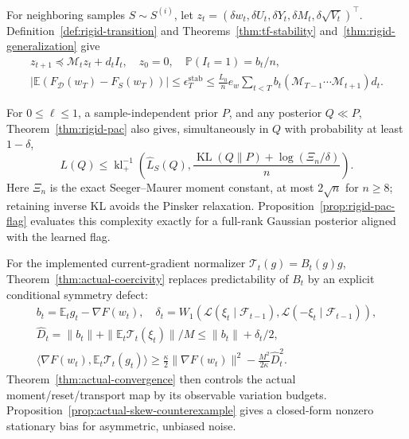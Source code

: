 For neighboring samples $S\sim S^{(i)}$, let
$z_t=(\delta w_t,\delta U_t,\delta Y_t,\delta M_t,\delta\sqrt{V_t})^\top$.
Definition~\ref{def:rigid-transition} and Theorems~\ref{thm:tf-stability}
and~\ref{thm:rigid-generalization} give
\begin{gather}
 z_{t+1}\preceq\mathcal M_tz_t+d_t I_t,\quad z_0=0,\quad
 \mathbb P(I_t=1)=b_t/n,\\
 \left|\mathbb E(F_\mathcal D(w_T)-F_S(w_T))\right|
 \le\epsilon_T^{\mathrm{stab}}
 \le\frac{L_0}{n}e_w\sum_{t<T}b_t
                  (\mathcal M_{T-1}\cdots\mathcal M_{t+1})d_t.
\end{gather}

For $0\le\ell\le1$, a sample-independent prior $P$, and any posterior $Q\ll P$,
Theorem~\ref{thm:rigid-pac} also gives, simultaneously in $Q$ with probability
at least $1-\delta$,
\begin{equation}
 L(Q)\le\operatorname{kl}_+^{-1}\!\left(\widehat L_S(Q),
 \frac{\operatorname{KL}(Q\|P)+\log(\Xi_n/\delta)}n\right).
\end{equation}
Here $\Xi_n$ is the exact Seeger--Maurer moment constant, at most
$2\sqrt n$ for $n\ge8$; retaining inverse KL avoids the Pinsker relaxation.
Proposition~\ref{prop:rigid-pac-flag} evaluates this complexity exactly for a
full-rank Gaussian posterior aligned with the learned flag.

For the implemented current-gradient normalizer $\mathcal T_t(g)=B_t(g)g$,
Theorem~\ref{thm:actual-coercivity} replaces predictability of $B_t$ by an explicit
conditional symmetry defect:
\begin{gather}
 b_t=\mathbb E_tg_t-\nabla F(w_t),\quad
 \delta_t=W_1(\mathcal L(\xi_t\mid\mathcal F_{t-1}),
                    \mathcal L(-\xi_t\mid\mathcal F_{t-1})),\\
 \widehat D_t=\|b_t\|+\|\mathbb E_t\mathcal T_t(\xi_t)\|/M
 \le\|b_t\|+\delta_t/2,\\
 \langle\nabla F(w_t),\mathbb E_t\mathcal T_t(g_t)\rangle
 \ge\tfrac\kappa2\|\nabla F(w_t)\|^2-\tfrac{M^2}{2\kappa}\widehat D_t^2.
\end{gather}
Theorem~\ref{thm:actual-convergence} then controls the actual moment/reset/transport
map by its observable variation budgets. Proposition~\ref{prop:actual-skew-counterexample}
gives a closed-form nonzero stationary bias for asymmetric, unbiased noise.

